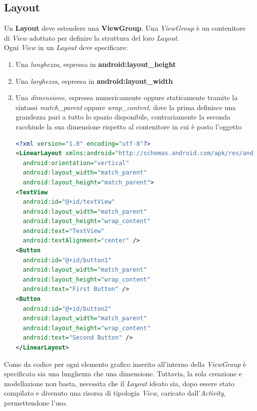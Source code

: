 \documentclass{article}
\begin{document}
\subsection*{Layout}
Un \textbf{Layout} deve estendere una \textbf{ViewGroup}. Una \textit{ViewGroup} è un contenitore di \textit{View} adottato per definire la struttura del loro \textit{Layout}. \vspace*{14pt}\\
Ogni \textit{View} in un \textit{Layout} deve specificare:
\begin{enumerate}
  \itemsep0em
  \renewcommand{\labelenumi}{-}
  \item Una \textit{lunghezza}, espressa in \textbf{android:layout\_height}
  \item Una \textit{larghezza}, espressa in \textbf{android:layout\_width} 
  \item Una \textit{dimensione}, espressa numericamente oppure staticamente tramite la sintassi \textit{match\_parent} oppure \textit{wrap\_content}, dove la prima definisce una grandezza pari a tutto lo spazio disponibile, contrariamente la seconda racchiude la sua dimensione rispetto al contenitore in cui è posto l'oggetto \\
  \begin{lstlisting}[language=XML, title=Definizione del layout di una view]
<?xml version="1.0" encoding="utf-8"?>
<LinearLayout xmlns:android="http://schemas.android.com/apk/res/android"
  android:orientation="vertical"
  android:layout_width="match_parent"
  android:layout_height="match_parent">
<TextView
  android:id="@+id/textView"
  android:layout_width="match_parent"
  android:layout_height="wrap_content"
  android:text="TextView"
  android:textAlignment="center" />
<Button
  android:id="@+id/button1"
  android:layout_width="match_parent"
  android:layout_height="wrap_content"
  android:text="First Button" />
<Button
  android:id="@+id/button2"
  android:layout_width="match_parent"
  android:layout_height="wrap_content"
  android:text="Second Button" />
</LinearLayout>
  \end{lstlisting}
\end{enumerate}
Come da codice per ogni elemento grafico inserito all'interno della \textit{ViewGroup} è specificata sia una lunghezza che una dimensione.
Tuttavia, la sola creazione e modellazione non basta, necessita che il \textit{Layout} ideato sia, dopo essere stato compilato e divenuto una risorsa di tipologia \textit{View}, caricato dall'\textit{Activity}, permettendone l'uso. \\
\end{document}
